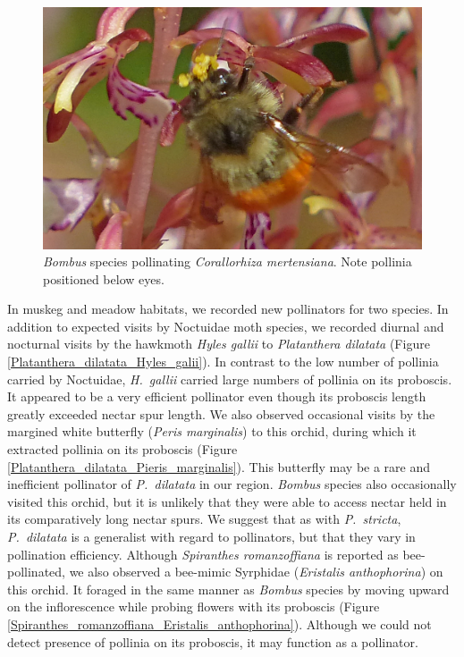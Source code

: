 \begin{multicols}{2}
\begin{figure}[H]
\begin{center}
\vspace{2mm}
\includegraphics[width=\textwidth]{img/Corallorhiza_mertensiana_Bombus.jpg}
\caption{\emph{Bombus} species pollinating \emph{Corallorhiza mertensiana}. Note pollinia positioned below eyes.}
\label{Corallorhiza_mertensiana_Bombus}
\end{center}
\end{figure}


In muskeg and meadow habitats, we recorded new pollinators for two
species. In addition to expected visits by Noctuidae moth species, we
recorded diurnal and nocturnal visits by the hawkmoth \emph{Hyles
gallii} to \emph{Platanthera dilatata} (Figure \ref{Platanthera_dilatata_Hyles_galii}). In contrast to the
low number of pollinia carried by Noctuidae, \emph{H.\ gallii} carried
large numbers of pollinia on its proboscis. It appeared to be a very
efficient pollinator even though its proboscis length greatly exceeded
nectar spur length. We also observed occasional visits by the margined
white butterfly (\emph{Peris marginalis}) to this orchid, during which
it extracted pollinia on its proboscis (Figure \ref{Platanthera_dilatata_Pieris_marginalis}). This butterfly may
be a rare and inefficient pollinator of \emph{P.\ dilatata} in our
region. \emph{Bombus} species also occasionally visited this orchid, but it is
unlikely that they were able to access nectar held in its comparatively
long nectar spurs. We suggest that as with \emph{P.\ stricta},
\emph{P.\ dilatata} is a generalist with regard to pollinators, but that
they vary in pollination efficiency. Although \emph{Spiranthes
romanzoffiana} is reported as bee-pollinated, we also observed a
bee-mimic Syrphidae (\emph{Eristalis anthophorina}) on this orchid. It
foraged in the same manner as \emph{Bombus} species by moving upward on
the inflorescence while probing flowers with its proboscis (Figure \ref{Spiranthes_romanzoffiana_Eristalis_anthophorina}).
Although we could not detect presence of pollinia on its proboscis, it
may function as a pollinator.


\end{multicols}
